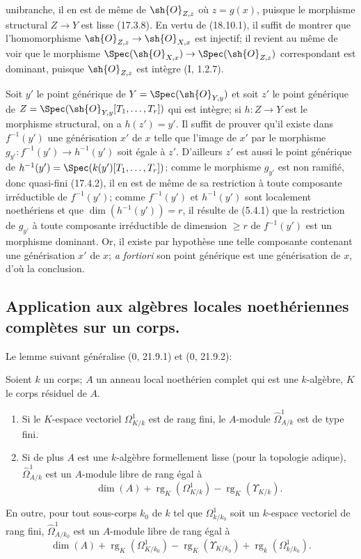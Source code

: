 unibranche, il en est de même de $\sh{O}_{Z,z}$ où $z=g(x)$, puisque le morphisme structural $Z\to Y$ est lisse (17.3.8). En vertu de (18.10.1), il suffit de montrer que l'homomorphisme $\sh{O}_{Z,z}\to\sh{O}_{X,x}$ est injectif; il revient au même de voir que le morphisme $\Spec(\sh{O}_{X,x})\to\Spec(\sh{O}_{Z,z})$ correspondant est dominant, puisque $\sh{O}_{Z,z}$ est intègre (I, 1.2.7).

Soit $y'$ le point générique de $Y=\Spec(\sh{O}_{Y,y})$ et soit $z'$ le point générique de $Z=\Spec(\sh{O}_{Y,y}[T_1,\ldots,T_r])$ qui est intègre; si $h:Z\to Y$ est le morphisme structural, on a $h(z')=y'$. Il suffit de prouver qu'il existe dans $f^{-1}(y')$ une générisation $x'$ de $x$ telle que l'image de $x'$ par le morphisme $g_{y'}:f^{-1}(y')\to h^{-1}(y')$ soit égale à $z'$. D'ailleurs $z'$ est aussi le point générique de $h^{-1}(y')=\Spec(k(y')[T_1,\ldots,T_r])$; comme le morphisme $g_{y'}$ est non ramifié, donc quasi-fini (17.4.2), il en est de même de sa restriction à toute composante irréductible de $f^{-1}(y')$; comme $f^{-1}(y')$ et $h^{-1}(y')$ sont localement noethériens et que $\dim(h^{-1}(y'))=r$, il résulte de (5.4.1) que la restriction de $g_{y'}$ à toute composante irréductible de dimension $\geq r$ de $f^{-1}(y')$ est un morphisme dominant. Or, il existe par hypothèse une telle composante contenant une générisation $x'$ de $x$; \emph{a fortiori} son point générique est une générisation de $x$, d'où la conclusion.

\subsection{Application aux algèbres locales noethériennes complètes sur un corps.}

Le lemme suivant généralise (0, 21.9.1) et (0, 21.9.2):

\begin{lemma}[18.11.1]
\label{IV.18.11.1}
Soient $k$ un corps; $A$ un anneau local noethérien complet qui est une $k$-algèbre, $K$ le corps résiduel de $A$.
\begin{enumerate}
  \item[(i)] Si le $K$-espace vectoriel $\Omega^1_{K/k}$ est de rang fini, le $A$-module $\hat{\Omega}^1_{A/k}$ est de type fini.
  \item[(ii)] Si de plus $A$ est une $k$-algèbre formellement lisse (pour la topologie adique), $\hat{\Omega}^1_{A/k}$ est un $A$-module libre de rang égal à
\[
    \dim(A)+\operatorname{rg}_K(\Omega^1_{K/k})-\operatorname{rg}_K(\Upsilon_{K/k}).
\]
\end{enumerate}
En outre, pour tout sous-corps $k_0$ de $k$ tel que $\Omega^1_{k/k_0}$ soit un $k$-espace vectoriel de rang fini, $\hat{\Omega}^1_{A/k_0}$ est un $A$-module libre de rang égal à
\[
  \dim(A)+\operatorname{rg}_K(\Omega^1_{K/k_0})-\operatorname{rg}_K(\Upsilon_{K/k_0})+\operatorname{rg}_k(\Omega^1_{k/k_0}).
\]
\end{lemma}

